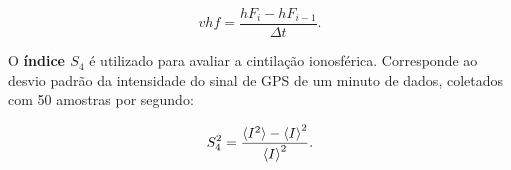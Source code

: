 \begin{equation}
vhf=\frac{hF_i-hF_{i-1}}{\Delta t}\mbox{.}
\end{equation}

O {\bf índice $S_4$} é utilizado para avaliar a cintilação ionosférica. Corresponde ao desvio padrão da intensidade do sinal de GPS de um minuto de dados, coletados com 50 amostras por segundo:

\begin{equation}
S_4^2=\frac{\braket{I^2}-\braket{I}^2}{\braket{I}^2}\mbox{.}
\end{equation}
